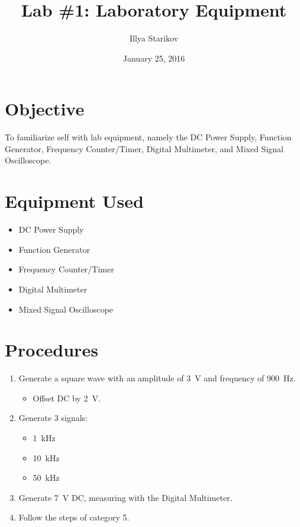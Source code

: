 \documentclass[12pt]{article}
\begin{document}
\title{Lab \#1: Laboratory Equipment}
\date{January 25, 2016}
\author{Illya Starikov}
\maketitle


\section{Objective}
To familiarize self with lab equipment, namely the DC Power Supply, Function Generator, Frequency Counter/Timer, Digital Multimeter, and Mixed Signal Oscilloscope.

\section{Equipment Used}
\begin{itemize}
\item DC Power Supply
\item Function Generator
\item Frequency Counter/Timer
\item Digital Multimeter
\item Mixed Signal Oscilloscope
\end{itemize}

\section{Procedures}
\begin{enumerate}
\item Generate a square wave with an amplitude of \SI{3}{\volt} and frequency of \SI{900}{\hertz}.
    \begin{itemize}
    \item Offset DC by \SI{2}{\volt}.
    \end{itemize}
\item Generate 3 signals:
    \begin{itemize}
    \item \SI{1}{\kilo\hertz}
    \item \SI{10}{\kilo\hertz}
    \item \SI{50}{\kilo\hertz}
    \end{itemize}
\item Generate \SI{7}{\volt} DC, measuring with the Digital Multimeter.
\item Follow the steps of category 5.
\end{enumerate}
\end{document}
